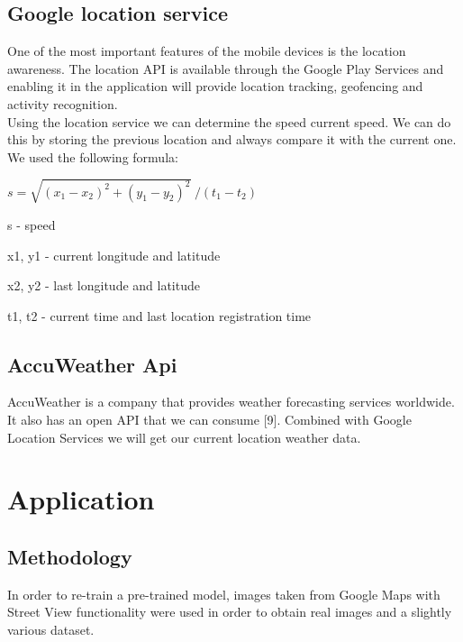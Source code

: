 \documentclass[12pt]{report}
\renewcommand{\_}{\kern-1.5pt\textunderscore\kern-1.5pt}
\begin{document}
\section{Google location service}
\tab One of the most important features of the mobile devices is the location awareness. The location API is available through the Google Play Services and enabling it in the application will provide location tracking, geofencing and activity recognition. \\
\tab Using the location service we can determine the speed current speed. We can do this by storing the previous location and always compare it with the current one. We used the following formula:\par

 \( s = \sqrt{ \left( x_{1} - x_{2} \right) ^{2}+ \left( y_{1} -y_{2} \right) ^{2}^{}}~/   \left( t_{1} - t_{2} \right)  \) \par


\vspace{\baselineskip}
s - speed\par

x1, y1 - current longitude and latitude\par

x2, y2 - last longitude and latitude\par

t1, t2 - current time and last location registration time\par

\section{AccuWeather Api}
\begin{justify}
\tab AccuWeather is a company that provides weather forecasting services worldwide. It also has an open API that we can consume [9]. Combined with Google Location Services we will get our current location weather data. 
\end{justify}\par

\chapter{Application}
\section{Methodology}
In order to re-train a pre-trained model, images taken from Google Maps with Street View functionality were used in order to obtain real images and a slightly various dataset.\par
\end{document}
